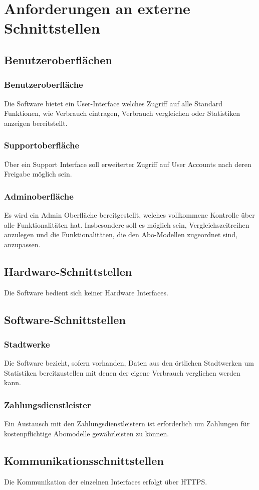\section{Anforderungen an externe Schnittstellen}
\subsection{Benutzeroberflächen}
\subsubsection{Benutzeroberfläche}
Die Software bietet ein User-Interface welches Zugriff auf alle Standard Funktionen, wie Verbrauch eintragen, Verbrauch vergleichen oder Statistiken anzeigen bereitstellt.
\subsubsection{Supportoberfläche}
Über ein Support Interface soll erweiterter Zugriff auf User Accounts nach deren Freigabe möglich sein.
\subsubsection{Adminoberfläche}
Es wird ein Admin Oberfläche bereitgestellt, welches vollkommene Kontrolle über alle Funktionalitäten hat.
Insbesondere soll es möglich sein, Vergleichszeitreihen anzulegen und die Funktionalitäten, die den Abo-Modellen zugeordnet sind, anzupassen.
\subsection{Hardware-Schnittstellen}
Die Software bedient sich keiner Hardware Interfaces.
\subsection{Software-Schnittstellen}
\subsubsection{Stadtwerke}
Die Software bezieht, sofern vorhanden, Daten aus den örtlichen Stadtwerken um Statistiken bereitzustellen mit denen der eigene Verbrauch verglichen werden kann.
\subsubsection{Zahlungsdienstleister}
Ein Austausch mit den Zahlungsdienstleistern ist erforderlich um Zahlungen für kostenpflichtige Abomodelle gewährleisten zu können.
\subsection{Kommunikationsschnittstellen}
Die Kommunikation der einzelnen Interfaces erfolgt über HTTPS.